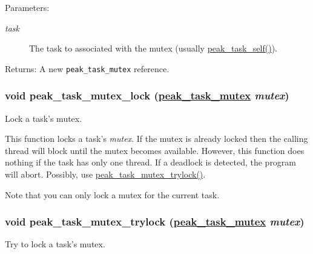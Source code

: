 \begin{Desc}
\item[Parameters:]
\begin{description}
\item[{\em task}]The task to associated with the mutex (usually \hyperlink{group__task__common_ga8}{peak\_\-task\_\-self()}).\end{description}
\end{Desc}
\begin{Desc}
\item[Returns:]A new {\tt peak\_\-task\_\-mutex} reference. \end{Desc}
\hypertarget{group__task__sync_ga9}{
\subsubsection[peak\_\-task\_\-mutex\_\-lock]{\setlength{\rightskip}{0pt plus 5cm}void peak\_\-task\_\-mutex\_\-lock (\hyperlink{group__task__sync_ga1}{peak\_\-task\_\-mutex} {\em mutex})}}
\label{group__task__sync_ga9}


Lock a task's mutex. 

This function locks a task's {\em mutex\/}. If the mutex is already locked then the calling thread will block until the mutex becomes available. However, this function does nothing if the task has only one thread. If a deadlock is detected, the program will abort. Possibly, use \hyperlink{group__task__sync_ga10}{peak\_\-task\_\-mutex\_\-trylock()}.\par
 Note that you can only lock a mutex for the current task. \hypertarget{group__task__sync_ga10}{
\subsubsection[peak\_\-task\_\-mutex\_\-trylock]{\setlength{\rightskip}{0pt plus 5cm}void peak\_\-task\_\-mutex\_\-trylock (\hyperlink{group__task__sync_ga1}{peak\_\-task\_\-mutex} {\em mutex})}}
\label{group__task__sync_ga10}


Try to lock a task's mutex. 

